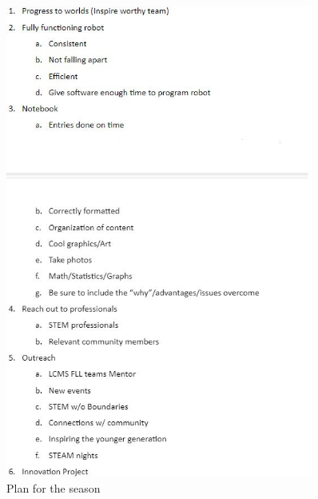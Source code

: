 \begin{figure}[htp]
\centering
\includegraphics[width=0.9\textwidth, angle=0]{Meetings/August/08-10-21/8-10-21_Image1 - Nathan Forrer.JPG}
\caption{Plan for the season}
\label{fig:pic1}
\end{figure}

